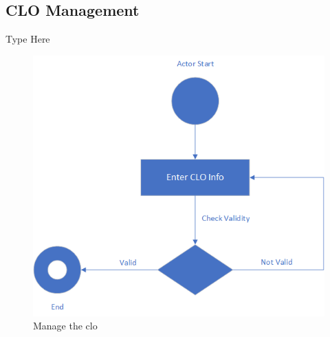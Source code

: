 \documentclass[12pt,a4paper]{article}
\begin{document}
\subsection{CLO Management}
Type Here
\begin{figure}[H]
  \centering
    \includegraphics[scale=1]{CLO}
    
  \caption{Manage the clo}
\end{figure}
\end{document}
